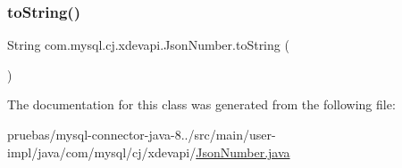\mbox{\label{classcom_1_1mysql_1_1cj_1_1xdevapi_1_1_json_number_acb62be6bedfac5f334be939c14d2b84d}} 
\subsubsection{\texorpdfstring{to\+String()}{toString()}}
{\footnotesize\ttfamily String com.\+mysql.\+cj.\+xdevapi.\+Json\+Number.\+to\+String (\begin{DoxyParamCaption}{ }\end{DoxyParamCaption})}



The documentation for this class was generated from the following file\+:\begin{DoxyCompactItemize}
\item 
pruebas/mysql-\/connector-\/java-\/8../src/main/user-\/impl/java/com/mysql/cj/xdevapi/\mbox{\hyperlink{_json_number_8java}{Json\+Number.\+java}}\end{DoxyCompactItemize}

